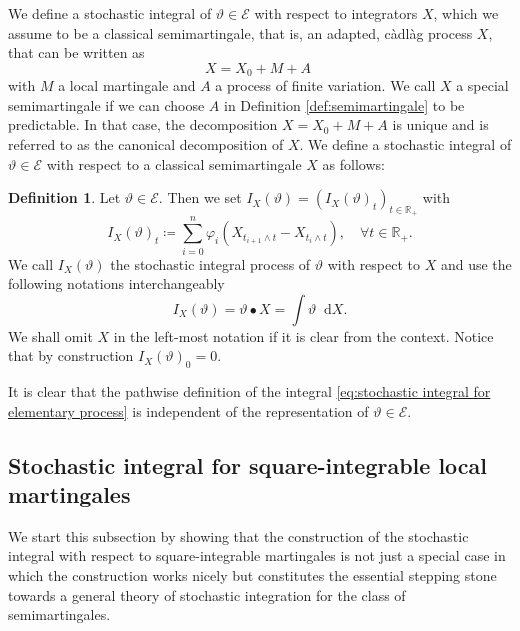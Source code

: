 \documentclass[11pt,a4paper,twoside,openany]{report}
\numberwithin{equation}{section}
\newcommand{\diff}{\mathop{}\!\mathrm{d}}
\theoremstyle{plain} %
\theoremstyle{definition} %
\newtheorem{definition}[theorem]{Definition}
\theoremstyle{remark} %
\begin{document}
We define a stochastic integral of \(\vartheta\in\mathcal{E}\) with respect to integrators \(X\), which we assume to be a classical semimartingale, that is, an adapted, càdlàg process \(X\), that can be written as 
\begin{equation}\label{def:semimartingale}
    X = X_0+M+A\;
\end{equation}
with \(M\) a local martingale and \(A\) a process of finite variation. We call \(X\) a special semimartingale if we can choose \(A\) in Definition \ref{def:semimartingale} to be predictable. In that case, the decomposition \(X=X_0+M+A\) is unique and is referred to as the canonical decomposition of \(X\).
We define a stochastic integral of \(\vartheta\in\mathcal{E}\) with respect to a classical semimartingale \(X\) as follows:
\begin{definition}\label{def:integral of simple processes}
Let \(\vartheta\in\mathcal{E}\). Then we set 
\(I_X(\vartheta)=(I_X(\vartheta)_t)_{t\in\mathbb{R}_+}\)
 with
    \begin{equation}\label{eq:stochastic integral for elementary process}
        I_X(\vartheta)_t\coloneqq \sum_{i=0}^n \varphi_i(X_{t_{i+1}\wedge t}-X_{t_{i}\wedge t}),\quad \forall t\in\mathbb{R}_+.
    \end{equation}
    We call \(I_X(\vartheta)\) the stochastic integral process of \(\vartheta\) with respect to \(X\) and use the following notations interchangeably
    \begin{equation*}
        I_X(\vartheta)=\vartheta\bullet X=\int \vartheta\diff X.
    \end{equation*}
    We shall omit \(X\) in the left-most notation if it is clear from the context. Notice that by construction \(I_X(\vartheta)_0=0\). 
\end{definition}
It is clear that the pathwise definition of the integral \eqref{eq:stochastic integral for elementary process} is independent of the representation of \(\vartheta\in\mathcal{E}\).
\subsection{Stochastic integral for square-integrable local martingales}\label{sec:Stochastic Integration for square-integrable Martingales}

 We start this subsection by showing that the construction of the stochastic integral with respect to square-integrable martingales is not just a special case in which the construction works nicely but constitutes the essential stepping stone towards a general theory of stochastic integration for the class of semimartingales.
\end{document}
